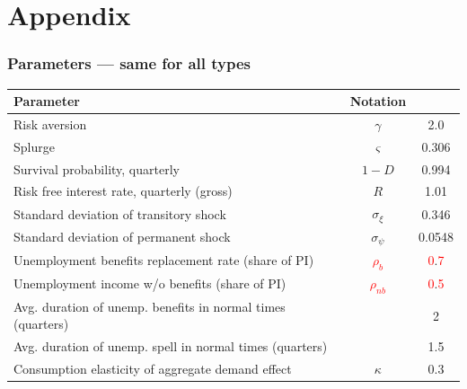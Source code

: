\documentclass[pdflatex,aspectratio=169, handout]{beamer}
\begin{document}
\section{Appendix}

\begin{frame}
\frametitle{Parameters --- same for all types}
\label{sli:paramsSame}
\begin{tabular}{lcc}
	\toprule
	Parameter & Notation & \text{Value} \\ \midrule 
	Risk aversion & $\gamma$ & 2.0 \\ 
	Splurge & $\varsigma$ & 0.306 \\ 
	Survival probability, quarterly & $1-D$ & 0.994 \\
	Risk free interest rate, quarterly (gross) & $R$ & 1.01 \\ 
	Standard deviation of transitory shock & $\sigma_\xi$ & 0.346 \\
	Standard deviation of permanent shock & $\sigma_\psi$ & 0.0548 \\ 
	Unemployment benefits replacement rate (share of PI) & \textcolor{red}{$\rho_b$} & \textcolor{red}{0}.\textcolor{red}{7} \\ 
	Unemployment income w/o benefits (share of PI) & \textcolor{red}{$\rho_{nb}$} & \textcolor{red}{0}.\textcolor{red}{5} \\ 
	Avg. duration of unemp. benefits in normal times (quarters) & & 2 \\
	Avg. duration of unemp. spell in normal times (quarters) & & 1.5 \\
	Consumption elasticity of aggregate demand effect & $\kappa$ & 0.3 
	\\ \bottomrule 
\end{tabular}

\vspace{.5cm}
\hyperlink{Parameters}{} 
\end{frame}
\end{document}
